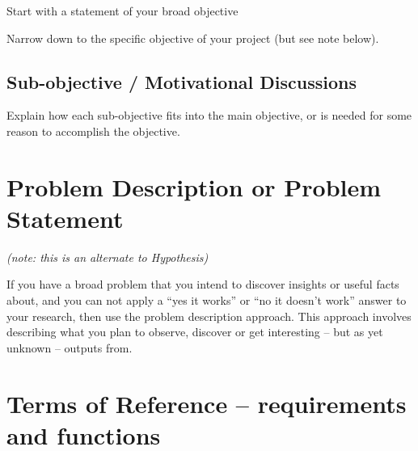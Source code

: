 Start with a statement of your broad objective

Narrow down to the specific objective of your project (but see note below).


\subsection{Sub-objective / Motivational Discussions}
\label{sec:SubObjectives}

Explain how each sub-objective fits into the main objective, or is needed for some reason to accomplish the objective.

\section{Problem Description or Problem Statement}

\emph{(note: this is an alternate to Hypothesis)}

If you have a broad problem that you intend to discover insights or useful facts about, and you can not apply a ``yes it works'' or ``no it doesn't work'' answer to your research, then use the problem description approach.  This approach involves describing what you plan to observe, discover or get interesting -- but as yet unknown -- outputs from.

\section{Terms of Reference -- requirements and functions}

